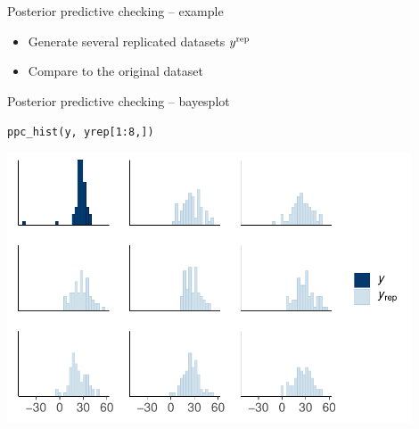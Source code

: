 \documentclass[t]{beamer}
\begin{document}
\begin{frame}{Posterior predictive checking -- example}

  \begin{itemize}
  \item<1-> Generate several replicated datasets $y^{\rm rep}$
  \item<2-> Compare to the original dataset
  \end{itemize}
  \vspace{-1\baselineskip}

\end{frame}

\begin{frame}{Posterior predictive checking -- bayesplot}

  \vspace{-1\baselineskip}
  \texttt{ppc\_hist(y, yrep[1:8,])}
  
  \includegraphics[height=8cm]{Newcomb_ppc_hist.pdf}

\end{frame}
\end{document}

